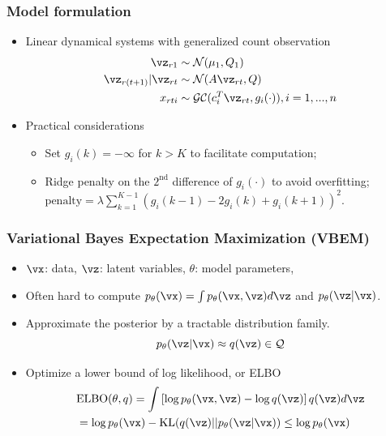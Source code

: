 \documentclass[16pt,presentation]{beamer}
\begin{document}
\begin{frame}
\frametitle{Model formulation}
 \begin{itemize}
 \item Linear dynamical systems with generalized count observation 
 \[\begin{split}
 \vz_{r1} &\sim \N(\mu_1, Q_1)\\
 \vz_{r(t+1)} | \vz_{rt} &\sim \N(A \vz_{rt}, Q)\\
 x_{rti} & \sim \mathcal{GC}(c_i^T \vz_{rt}, g_i(\cdot)), i = 1,...,n
 \end{split}\]
 \item Practical considerations
 \begin{itemize}
 \item Set $g_i(k) = -\infty$ for $k > K$ to facilitate computation;
 \item Ridge penalty on the $2^{\text{nd}}$ difference of $g_i(\cdot)$ to avoid overfitting; $\text{penalty} = \lambda \sum_{k=1}^{K-1} (g_i(k-1) - 2 g_i(k) + g_i(k+1))^2$.
 \end{itemize}
 \end{itemize}
\end{frame}


\begin{frame}
\frametitle{Variational Bayes Expectation Maximization (VBEM)}
\begin{itemize}
\item $\vx$: data, $\vz$: latent variables, $\theta$: model parameters, 
\item Often hard to compute $p_\theta(\vx) = \int p_\theta(\vx, \vz) d \vz$ and $p_\theta(\vz | \vx)$.
\item Approximate the posterior by a \alert{tractable} distribution family.
\[p_{\theta}(\vz | \vx) \approx q(\vz) \in \mathcal{Q}\]
\item Optimize a \alert{lower bound of log likelihood}, or ELBO %
\[\begin{split}
&\text{ELBO}(\theta, q) = \int \left[\log p_{\theta}(\vx, \vz) - \log q(\vz)\right] q(\vz) d\vz \\
&= \log p_{\theta}(\vx) - \text{KL}(q(\vz) || p_\theta(\vz | \vx)) \leq \log p_{\theta}(\vx) %
\end{split}\]
\end{itemize}
\end{frame}
\end{document}
